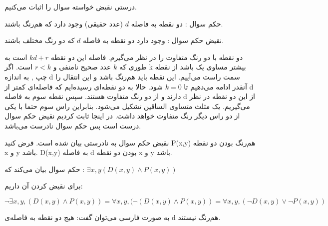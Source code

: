 \documentclass[11pt,largemargins]{h2wp}
\begin{document}
\solution
 درستی نقیض خواسته سوال را اثبات می‌کنیم.
 
حکم سوال : دو نقطه به فاصله $d$ (عدد حقیقی) وجود دارد که هم‌رنگ باشند.

نقیض حکم سوال : وجود دارد دو نقطه به فاصله $d$ که دو رنگ مختلف باشند.

دو نقطه با دو رنگ متفاوت را در نظر می‌گیرم. فاصله این دو نقطه $ kd + r $ است به طوری که $ k $ عدد صحیح نامنفی و $ r < k $  است. 
اگر k بیشتر مساوی یک باشد از نقطه چپ , به اندازه d سمت راست می‌آییم. این نقطه باید هم‌رنگ باشد و این انتقال را آنقدر ادامه می‌دهیم تا $ k = 0 $ شود. حالا به دو نقطه‌ای رسیده‌ایم که فاصله‌ای کمتر از d دارند و از دو رنگ متفاوت هستند. 
سپس نقطه سوم به فاصله d از این دو نقطه در نظر می‌گیریم. یک مثلث متساوی الساقین تشکیل می‌شود. بنابراین راس سوم حتما با یکی از دو راس دیگر رنگ متفاوت خواهد داشت. در اینجا ثابت کردیم نقیض حکم سوال درست است پس حکم سوال نادرست می‌باشد. 






 \notes

نقیض حکم سوال به نادرستی بیان شده است. فرض کنید P(x,y) هم‌رنگ بودن دو نقطه  x و y باشد. D(x,y) به فاصله d بودن دو نقطه  x و y باشد.

حکم سوال بیان می‌کند که : 
$ \exists x,y ( D(x,y) \wedge P(x,y)) $


برای نقیض کردن آن داریم:

$$ \neg \exists x,y, ( D(x,y) \wedge P(x,y)) = \forall x,y, (\neg (D(x,y) \wedge P(x,y)) = \forall x,y, (\neg D(x,y) \vee \neg P(x,y)) $$


به صورت فارسی می‌توان گفت: هیج دو نقطه به فاصله‌ی d هم‌رنگ نیستند.
\end{document}
